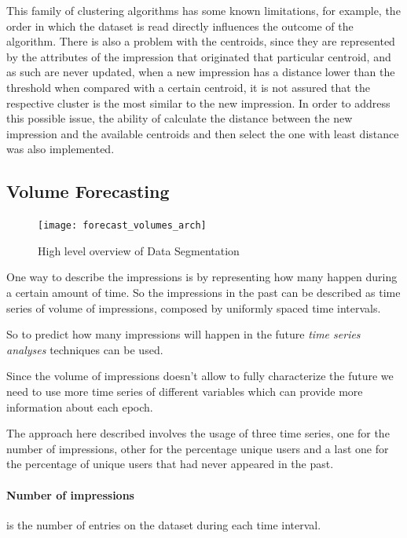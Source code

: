 This family of clustering algorithms has some known limitations, for example, the
order in which the dataset is read directly influences the outcome of the
algorithm. There is also a problem with the centroids, since they are represented
by the attributes of the impression that originated that particular centroid,
and as such are never updated,
when a new impression has a distance lower than the threshold when compared with
a certain centroid, it is not assured that the respective cluster is the most
similar to the new impression.
In order to address this possible issue, the ability of calculate the distance
between the new impression and the available centroids and then select the one
with least distance was also implemented.

\subsection{Volume Forecasting}\label{subsec:volume_forecast}

\begin{figure}[h] \begin{center} \leavevmode
\texttt{[image: forecast\_volumes\_arch]} \caption{ High level overview
of Data Segmentation} \label{fig:forecast_volumes_arch} \end{center} \end{figure}

One way to describe the impressions is by representing how many happen during a
certain amount of time. So the impressions in the past can be described as time
series of volume of impressions, composed by uniformly spaced time intervals. 

So to predict how many impressions will happen in the future \emph{time series
analyses} techniques can be used. 

Since the volume of impressions doesn't allow to fully characterize the future
we need to use more time series of different variables which can provide more
 information about each epoch.

The approach here described involves the usage of three time series, one for the
number of impressions, other for the percentage unique users and a last one for
the percentage of unique users that had never appeared in the past.

\paragraph{Number of impressions}
is the number of entries on the dataset during each time interval.

